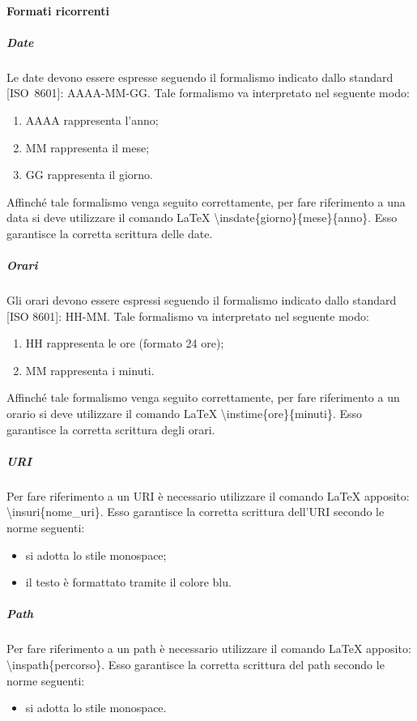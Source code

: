 			\paragraph{Formati ricorrenti}
				\subparagraph{Date}
					Le date devono essere espresse seguendo il formalismo indicato dallo standard [ISO~8601]: AAAA-MM-GG. Tale formalismo va interpretato nel seguente modo:
					\begin{enumerate}
						\item AAAA rappresenta l’anno;
						\item MM rappresenta il mese;
						\item GG rappresenta il giorno.
					\end{enumerate}
					Affinché tale formalismo venga seguito correttamente, per fare riferimento a una data si deve utilizzare il comando \LaTeX{} \textbackslash insdate\{giorno\}\{mese\}\{anno\}. Esso garantisce la corretta scrittura delle date.
				\subparagraph{Orari}
					Gli orari devono essere espressi seguendo il formalismo indicato dallo standard [ISO 8601]: HH-MM. Tale formalismo va interpretato nel seguente modo:
					\begin{enumerate}
						\item HH rappresenta le ore (formato 24 ore);
						\item MM rappresenta i minuti.
					\end{enumerate}
					Affinché tale formalismo venga seguito correttamente, per fare riferimento a un orario si deve utilizzare il comando \LaTeX{} \textbackslash instime\{ore\}\{minuti\}. Esso garantisce la corretta scrittura degli orari.
				\subparagraph{URI}
					Per fare riferimento a un URI è necessario utilizzare il comando \LaTeX{} apposito: \textbackslash insuri\{nome\_uri\}. Esso garantisce la corretta scrittura dell'URI secondo le norme seguenti:
					\begin{itemize}
						\item si adotta lo stile monospace;
						\item il testo è formattato tramite il colore blu.
					\end{itemize}
				\subparagraph{Path}
					Per fare riferimento a un path è necessario utilizzare il comando \LaTeX{} apposito: \textbackslash inspath\{percorso\}. Esso garantisce la corretta scrittura del path secondo le norme seguenti:
					\begin{itemize}
						\item si adotta lo stile monospace.
					\end{itemize}
